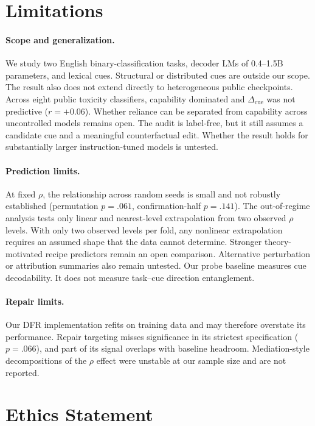 \documentclass[11pt]{article}
\newcommand{\cued}{\ensuremath{\Delta_{\mathrm{cue}}}}
\begin{document}
\section*{Limitations}

\paragraph{Scope and generalization.}
We study two English binary-classification tasks, decoder LMs of
0.4--1.5B parameters, and lexical cues. Structural or distributed cues are
outside our scope. The result also does not extend directly to heterogeneous public checkpoints. Across eight public toxicity classifiers, capability
dominated and \cued{} was not predictive ($r{=}{+}0.06$). Whether reliance
can be separated from capability across uncontrolled models remains open. The audit is label-free, but it still assumes a candidate cue and a meaningful counterfactual edit. Whether the result holds for substantially
larger instruction-tuned models is untested.

\paragraph{Prediction limits.}
At fixed $\rho$, the relationship across random seeds is small and not
robustly established (permutation $p{=}.061$, confirmation-half $p{=}.141$).
The out-of-regime analysis tests only linear and nearest-level extrapolation
from two observed $\rho$ levels. With only two observed levels per fold, any nonlinear extrapolation requires an assumed shape that the data cannot determine. Stronger theory-motivated recipe predictors remain an open comparison. Alternative perturbation or attribution summaries also remain
untested. Our probe baseline measures cue decodability. It does not measure task--cue direction entanglement.

\paragraph{Repair limits.}
Our DFR implementation refits on training data and may therefore overstate
its performance. Repair targeting misses significance in its strictest
specification ($p{=}.066$), and part of its signal overlaps with baseline
headroom. Mediation-style decompositions of the $\rho$ effect were unstable
at our sample size and are not reported.




\section*{Ethics Statement}
\end{document}
